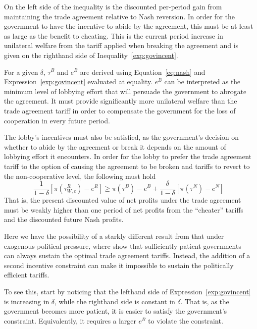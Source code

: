 \documentclass[12pt]{article}
\newcommand{\de}{\delta}
\begin{document}
On the left side of the inequality is the discounted per-period gain from maintaining the trade agreement relative to Nash reversion. In order for the government to have the incentive to abide by the agreement, this must be at least as large as the benefit to cheating. This is the current period increase in unilateral welfare from the tariff applied when breaking the agreement and is given on the righthand side of Inequality~\ref{exp:govincent}.

For a given $\de$, $\tau^B$ and $e^B$ are derived using Equation~\ref{eq:nash} and Expression~\ref{exp:govincent} evaluated at equality. $e^B$ can be interpreted as the minimum level of lobbying effort that will persuade the government to abrogate the agreement. It must provide significantly more unilateral welfare than the trade agreement tariff in order to compensate the government for the loss of cooperation in every future period.

The lobby's incentives must also be satisfied, as the government's decision on whether to abide by the agreement or break it depends on the amount of lobbying effort it encounters. In order for the lobby to prefer the trade agreement tariff to the option of causing the agreement to be broken and tariffs to revert to the non-cooperative level, the following must hold
\begin{equation}
  \frac{1}{1-\de}\left[\pi(\tau^R_{W,e}) - e^R\right] \geq \pi(\tau^B) - e^B + \frac{\de}{1-\de}\left[\pi(\tau^N) - e^N\right]
	\label{exp:lobby}
\end{equation}
That is, the present discounted value of net profits under the trade agreement must be weakly higher than one period of net profits from the ``cheater'' tariffs and the discounted future Nash profits.

Here we have the possibility of a starkly different result from that under exogenous political pressure, where \Textcite{bs2005} show that sufficiently patient governments can always sustain the optimal trade agreement tariffs. Instead, the addition of a second incentive constraint can make it impossible to sustain the politically efficient tariffs.

To see this, start by noticing that the lefthand side of Expression~\ref{exp:govincent} is increasing in $\de$, while the righthand side is constant in $\de$. That is, as the government becomes more patient, it is easier to satisfy the government's constraint. Equivalently, it requires a larger $e^B$ to violate the constraint.
\end{document}
